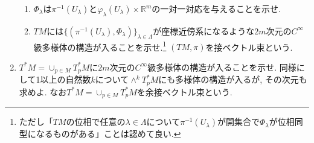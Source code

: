 \documentclass[dvipdfmx,a4paper,11pt]{article}
\newcommand{\R}{\mathbb{R}}
\theoremstyle{definition}
\begin{document}
\begin{enumerate}[label=\textbf{問}\ref*{sec-mfd-diff}.\arabic*]
\begin{enumerate}
\item $\Phi_{\lambda}$は$\pi^{-1}(U_{\lambda})$と$\varphi_{\lambda}(U_{\lambda}) \times \R^{m} $の一対一対応を与えることを示せ.
\item $TM$には$\{( \pi^{-1}(U_{\lambda}), \Phi_{\lambda} )\}_{\lambda \in \Lambda}$が座標近傍系になるような$2m$次元の$C^{\infty}$級多様体の構造が入ることを示せ.\footnote{ただし「$TM$の位相で任意の$\lambda \in \Lambda$について$\pi^{-1}(U_{\lambda})$が開集合で$\Phi_{\lambda}$が位相同型になるものがある」ことは認めて良い. } 
$(TM, \pi)$を接ベクトル束という. 
\end{enumerate}


\item $T^{*}M = \cup_{p \in M}T_{p}^{*}M$に$2m$次元の$C^{\infty}$級多様体の構造が入ることを示せ. 同様にして1以上の自然数$k$について$\wedge^{k}T_{p}^{*}M$にも多様体の構造が入るが, その次元も求めよ. なお$T^{*}M = \cup_{p \in M}T_{p}^{*}M$を余接ベクトル束という. 



\end{enumerate}
\end{document}
